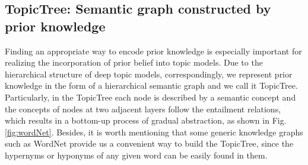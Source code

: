 \documentclass{article}
\newcommand{\xv}[0]{\ensuremath{\boldsymbol{x}} }
\newcommand{\Omegav}[0]{\ensuremath{\boldsymbol{\Omega}} }
\begin{document}
\subsection{TopicTree: Semantic graph constructed by prior knowledge}\label{sec:topictree}  
Finding an appropriate way to encode prior knowledge is especially important for realizing the incorporation of prior belief into topic models. Due to the hierarchical structure of deep topic models, correspondingly, we represent prior knowledge in the form of a hierarchical semantic graph and we call it TopicTree. Particularly, in the TopicTree each node is described by a semantic concept and the concepts of nodes at two adjacent layers follow the entailment relations, which results in a bottom-up process of gradual abstraction, as shown in Fig. \ref{fig:wordNet}. Besides, it is worth mentioning that some generic knowledge graphs such as WordNet \cite{miller1995wordnet} provide us a convenient way to build the TopicTree, since the hypernyms or hyponyms of any given word can be easily found in them.  
\end{document}
